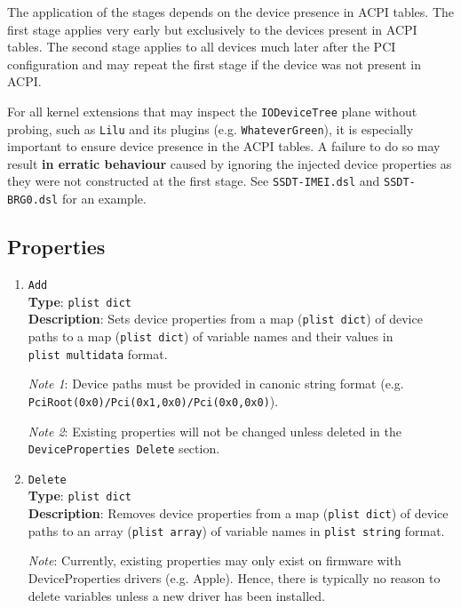 \documentclass[]{article}
\makeatletter
\renewcommand{\label}[1]{%
\zref@wrapper@immediate{\oldlabel{#1}}}  %
\makeatother
\begin{document}
The application of the stages depends on the device presence in ACPI tables.
The first stage applies very early but exclusively to the devices present in ACPI tables.
The second stage applies to all devices much later after the PCI configuration
and may repeat the first stage if the device was not present in ACPI.

For all kernel extensions that may inspect the \texttt{IODeviceTree} plane without probing,
such as \texttt{Lilu} and its plugins (e.g. \texttt{WhateverGreen}), it is especially
important to ensure device presence in the ACPI tables. A failure to do so may result
\textbf{in erratic behaviour} caused by ignoring the injected device properties
as they were not constructed at the first stage. See \texttt{SSDT-IMEI.dsl} and
\texttt{SSDT-BRG0.dsl} for an example.

\subsection{Properties}\label{devpropsprops}

\begin{enumerate}

\item
  \texttt{Add}\\
  \textbf{Type}: \texttt{plist\ dict}\\
  \textbf{Description}: Sets device properties from a map (\texttt{plist\ dict})
  of device paths to a map (\texttt{plist\ dict}) of variable names and their values
  in \texttt{plist\ multidata} format.

  \emph{Note 1}: Device paths must be provided in canonic string format
  (e.g. \texttt{PciRoot(0x0)/Pci(0x1,0x0)/Pci(0x0,0x0)}).

  \emph{Note 2}: Existing properties will not be changed unless deleted
  in the \texttt{DeviceProperties\ Delete} section.

\item
  \texttt{Delete}\\
  \textbf{Type}: \texttt{plist\ dict}\\
  \textbf{Description}: Removes device properties from a map (\texttt{plist\ dict})
  of device paths to an array (\texttt{plist\ array}) of variable names in
  \texttt{plist\ string} format.

  \emph{Note}: Currently, existing properties may only exist on firmware
  with DeviceProperties drivers (e.g. Apple). Hence, there is typically
  no reason to delete variables unless a new driver has been installed.

\end{enumerate}
\end{document}
